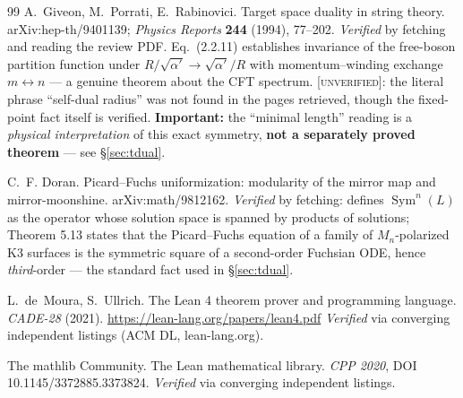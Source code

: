 \documentclass[11pt,a4paper]{article}
\theoremstyle{definition}
\theoremstyle{plain}
\begin{document}
\begin{thebibliography}{99}
A.~Giveon, M.~Porrati, E.~Rabinovici.
\newblock Target space duality in string theory.
\newblock arXiv:hep-th/9401139; \emph{Physics Reports} \textbf{244} (1994), 77--202.
\newblock \emph{Verified} by fetching and reading the review PDF. Eq.~(2.2.11) establishes
invariance of the free-boson partition function under $R/\sqrt{\alpha'}\to\sqrt{\alpha'}/R$
with momentum--winding exchange $m\leftrightarrow n$ --- a genuine theorem about the CFT
spectrum. \textsc{[unverified]}: the literal phrase ``self-dual radius'' was not found in the
pages retrieved, though the fixed-point fact itself is verified.
\newblock \textbf{Important:} the ``minimal length'' reading is a \emph{physical
interpretation} of this exact symmetry, \textbf{not a separately proved theorem} --- see
\S\ref{sec:tdual}.

C.~F. Doran.
\newblock Picard--Fuchs uniformization: modularity of the mirror map and mirror-moonshine.
\newblock arXiv:math/9812162.
\newblock \emph{Verified} by fetching: defines $\operatorname{Sym}^n(L)$ as the operator
whose solution space is spanned by products of solutions; Theorem 5.13 states that the
Picard--Fuchs equation of a family of $M_n$-polarized K3 surfaces is the symmetric square of
a second-order Fuchsian ODE, hence \emph{third}-order --- the standard fact used in
\S\ref{sec:tdual}.

L.~de~Moura, S.~Ullrich.
\newblock The Lean 4 theorem prover and programming language.
\newblock \emph{CADE-28} (2021). \url{https://lean-lang.org/papers/lean4.pdf}
\newblock \emph{Verified} via converging independent listings (ACM DL, lean-lang.org).

The mathlib Community.
\newblock The Lean mathematical library.
\newblock \emph{CPP 2020}, DOI 10.1145/3372885.3373824.
\newblock \emph{Verified} via converging independent listings.

\end{thebibliography}
\end{document}
